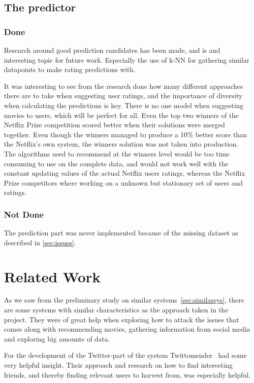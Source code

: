\subsection{The predictor}
\subsubsection{Done}
Research around good prediction candidates has been made, and is and interesting topic for future work. Especially the use of k-NN for gathering similar datapoints to make rating predictions with.

It was interesting to see from the research done how many different approaches there are to take when suggesting user ratings, and the importance of diversity when calculating the predictions is key. There is no one model when suggesting movies to users, which will be perfect for all. Even the top two winners of the Netflix Prize competition scored better when their solutions were merged together. Even though the winners managed to produce a 10\% better score than the Netflix's own system, the winners solution was not taken into production. The algorithms used to recommend at the winners level would be too time consuming to use on the complete data, and would not work well with the constant updating values of the actual Netflix users ratings, whereas the Netflix Prize competitors where working on a unknown but stationary set of users and ratings.

\subsubsection{Not Done}
The prediction part was never implemented because of the missing dataset as described in \ref{sec:issues}.


\section{Related Work}
As we saw from the preliminary study on similar systems~\ref{sec:similarsys}, there are some systems with similar characteristics as the approach taken in the project. They were of great help when exploring how to attack the issues that comes along with recommending movies, gathering information from social media and exploring big amounts of data.

For the development of the Twitter-part of the system Twittomender~\cite{twittomender} had some very helpful insight. Their approach and research on how to find interesting friends, and thereby finding relevant users to harvest from, was especially helpful.


